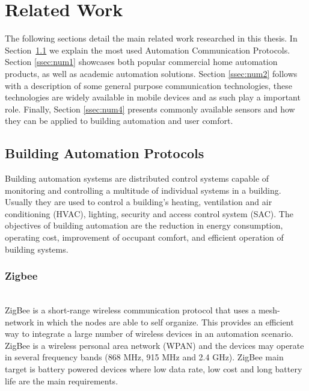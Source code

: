 \chapter{Related Work}
\label{chapter:relatedwork}



The following sections detail the main related work researched in this thesis. In Section~\ref{ssec:num3} we explain the most used Automation Communication Protocols. Section \ref{ssec:num1} showcases both popular commercial home automation products, as well as academic automation solutions.
Section \ref{ssec:num2} follows with a description of some general purpose communication technologies, these technologies are widely available in mobile devices and as such play a important role.
 Finally, Section \ref{ssec:num4} presents commonly available sensors and how they can be applied to building automation and user comfort.



\section{Building Automation Protocols} \label{ssec:num3}

Building automation systems are distributed control systems capable of monitoring and controlling a multitude of individual systems in a building. Usually they are used to control a building's heating, ventilation and air conditioning (HVAC), lighting, security and access control system (SAC).
The objectives of building automation are the reduction in energy consumption, operating cost, improvement of occupant comfort, and efficient operation of building systems.

\subsection{Zigbee}\label{zigbee_sub} \mbox{}\\

ZigBee \cite{livro_zigbee} is a short-range wireless communication protocol that uses a mesh-network in which the nodes are able to self organize. This provides an efficient way to integrate a large number of wireless devices in an automation scenario. ZigBee is a wireless personal area network (WPAN) and the devices may operate in several frequency bands (868 MHz, 915 MHz and 2.4 GHz). ZigBee main target is battery powered devices where low data rate, low cost and long battery life are the main requirements.

